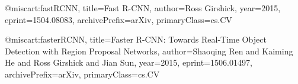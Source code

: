 
@misc{art:fastRCNN,
    title={Fast R-CNN},
    author={Ross Girshick},
    year={2015},
    eprint={1504.08083},
    archivePrefix={arXiv},
    primaryClass={cs.CV}
}

@misc{art:fasterRCNN,
    title={Faster R-CNN: Towards Real-Time Object Detection with Region Proposal Networks},
    author={Shaoqing Ren and Kaiming He and Ross Girshick and Jian Sun},
    year={2015},
    eprint={1506.01497},
    archivePrefix={arXiv},
    primaryClass={cs.CV}
}

